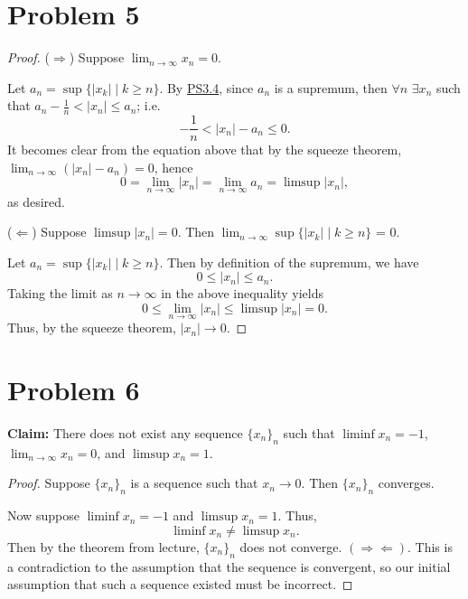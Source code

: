 \documentclass{article}
\begin{document}
\section*{Problem 5}
\begin{proof}
	($\Rightarrow$) Suppose $\lim_{n\to\infty} x_n = 0$.
	
	Let $a_n = \sup \{|x_k| \;|\; k\geq n\}$. By \href{https://github.com/ovega14/RealAnalysis_solutions/blob/main/PS3/18.100A_ps3.pdf}{PS3.4}, since $a_n$ is a supremum, then $\forall n$ $\exists x_n$ such that $a_n - \frac{1}{n} < |x_n| \leq a_n$; i.e.
	\begin{equation}
		-\frac{1}{n} < |x_n|-a_n \leq 0.
	\end{equation}
	It becomes clear from the equation above that by the squeeze theorem, \\$\lim_{n\to\infty}(|x_n| - a_n)=0$, hence
	\begin{equation}
		0=\lim_{n\to\infty}|x_n|=\lim_{n\to\infty}a_n = \limsup |x_n|,
	\end{equation}
	as desired.
	
	($\Leftarrow$) Suppose $\limsup |x_n|=0$. Then $\lim_{n\to\infty} \sup\{|x_k| \;|\; k\geq n\}$ = 0.
	
	Let $a_n = \sup\{|x_k| \;|\; k\geq n\}$. Then by definition of the supremum, we have
	\begin{equation}
		0 \leq |x_n| \leq a_n.
	\end{equation}
	Taking the limit as $n\to\infty$ in the above inequality yields
	\begin{equation}
		0 \leq \lim_{n\to\infty}|x_n|\leq \limsup |x_n|=0.
	\end{equation}
	Thus, by the squeeze theorem, $|x_n|\rightarrow 0$.
\end{proof}
\section*{Problem 6}
\textbf{Claim:} There does not exist any sequence $\{x_n\}_n$ such that $\liminf x_n = -1$, $\lim_{n\to\infty}x_n=0$, and $\limsup x_n=1$.
\begin{proof}
	Suppose $\{x_n\}_n$ is a sequence such that $x_n \rightarrow 0$. Then $\{x_n\}_n$ converges.
	
	Now suppose $\liminf x_n = -1$ and $\limsup x_n = 1$. Thus,
	\begin{equation}
		\liminf x_n \neq \limsup x_n.
	\end{equation}
	Then by the theorem from lecture, $\{x_n\}_n$ does not converge. $(\Rightarrow \Leftarrow)$. This is a contradiction to the assumption that the sequence is convergent, so our initial assumption that such a sequence existed must be incorrect.
\end{proof}
\end{document}
